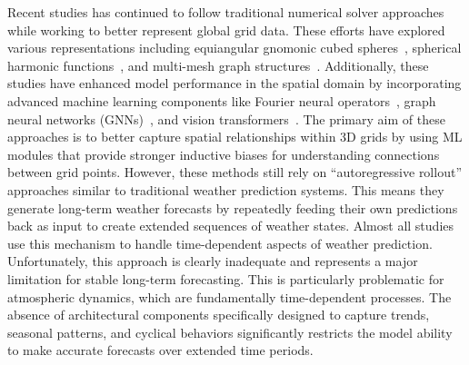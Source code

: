 \documentclass{article}
\begin{document}
    Recent studies has continued to follow traditional numerical solver approaches while working to better represent global grid data. These efforts have explored various representations including equiangular gnomonic cubed spheres~\cite{weyn2020improving}, spherical harmonic functions~\cite{pmlr-v202-bonev23a}, and multi-mesh graph structures~\cite{lam2023learning}. Additionally, these studies have enhanced model performance in the spatial domain by incorporating advanced machine learning components like Fourier neural operators~\cite{li2020fourier, pathak2022fourcastnet}, graph neural networks (GNNs)~\cite{keisler2022forecasting}, and vision transformers~\cite{benson2025atmospheric}. The primary aim of these approaches is to better capture spatial relationships within 3D grids by using ML modules that provide stronger inductive biases for understanding connections between grid points. However, these methods still rely on ``autoregressive rollout'' approaches similar to traditional weather prediction systems. This means they generate long-term weather forecasts by repeatedly feeding their own predictions back as input to create extended sequences of weather states. Almost all studies use this mechanism to handle time-dependent aspects of weather prediction. Unfortunately, this approach is clearly inadequate and represents a major limitation for stable long-term forecasting. This is particularly problematic for atmospheric dynamics, which are fundamentally time-dependent processes. The absence of architectural components specifically designed to capture trends, seasonal patterns, and cyclical behaviors significantly restricts the model ability to make accurate forecasts over extended time periods.
     
\end{document}
